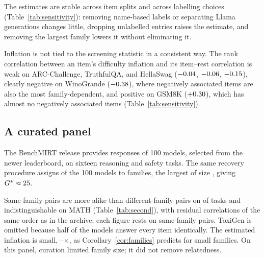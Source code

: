 \documentclass[10pt]{article}
\theoremstyle{remark}\newtheorem{remark}{Remark}
\begin{document}
The estimates are stable across item splits and across labelling choices
(Table~\ref{tab:sensitivity}): removing name-based labels or separating Llama
generations changes little, dropping unlabelled entries raises the estimate,
and removing the largest family lowers it without eliminating it.

Inflation is not tied to the screening statistic in a consistent way. The rank
correlation between an item's difficulty inflation and its item--rest
correlation is weak on ARC-Challenge, TruthfulQA, and HellaSwag
($-0.04$, $-0.06$, $-0.15$), clearly negative on
WinoGrande ($-0.38$), where negatively associated items are also the
most family-dependent, and positive on GSM8K ($+0.30$), which has almost no
negatively associated items (Table~\ref{tab:sensitivity}).

\subsection{A curated panel}\label{sec:second}
The BenchMIRT release \citep{morgan2026benchmirt} provides responses of 100
models, selected from the newer leaderboard, on sixteen reasoning and safety
tasks. The same recovery procedure assigns \SecondAssigned{} of the 100 models
to \SecondFamilies{} families, the largest of size \SecondLargest, giving
$G^\ast\approx25$.

Same-family pairs are more alike than different-family pairs on
\SecondClear{} of \SecondTasks{} tasks and indistinguishable on MATH
(Table~\ref{tab:second}), with residual correlations of the same order as in
the archive; each figure rests on \SecondPairs{} same-family pairs. ToxiGen is
omitted because half of the models answer every item identically. The
estimated inflation is small, \SecondInflMin--\SecondInflMax$\times$, as
Corollary~\ref{cor:families} predicts for small families. On this panel,
curation limited family size; it did not remove relatedness.
\end{document}
